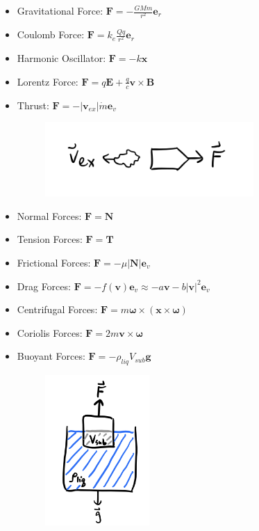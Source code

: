 \documentclass[
  letterpaper,
  DIV=11,
  numbers=noendperiod]{scrreprt}
\begin{document}
\begin{itemize}
\item
  Gravitational Force: \(\mathbf{F} = -\frac{GMm}{r^2} \mathbf{e}_r\)
\item
  Coulomb Force: \(\mathbf{F} = k_e \frac{Qq}{r^2} \mathbf{e}_r\)
\item
  Harmonic Oscillator: \(\mathbf{F} = -k\mathbf{x}\)
\item
  Lorentz Force:
  \(\mathbf{F} = q\mathbf{E} + \frac{q}{c}\mathbf{v} \times \mathbf{B}\)
\item
  Thrust: \(\mathbf{F} = - |\mathbf{v}_{ex}| \dot m \mathbf{e}_v\)

  \begin{figure}

  {\centering \includegraphics[width=3.125in,height=\textheight]{classical-mechanics/./resources/image-20230212030054782.png}

  }

  \end{figure}
\item
  Normal Forces: \(\mathbf{F} = \mathbf{N}\)
\item
  Tension Forces: \(\mathbf{F} = \mathbf{T}\)
\item
  Frictional Forces: \(\mathbf{F} = -\mu |\mathbf{N}| \mathbf{e}_v\)
\item
  Drag Forces:
  \(\mathbf{F} = -f(\mathbf{v}) \mathbf{e}_v \approx -a\mathbf{v} -b|\mathbf{v}|^2\mathbf{e}_v\)
\item
  Centrifugal Forces:
  \(\mathbf{F} = m\boldsymbol{\omega} \times (\mathbf{x} \times \boldsymbol{\omega})\)
\item
  Coriolis Forces:
  \(\mathbf{F} = 2m \mathbf{v} \times \boldsymbol{\omega}\)
\item
  Buoyant Forces: \(\mathbf{F} = - \rho_{liq} V_{sub} \mathbf{g}\)

  \begin{figure}

  {\centering \includegraphics[width=1.5625in,height=\textheight]{classical-mechanics/./resources/image-20230212031757163.png}

  }

  \end{figure}
\end{itemize}
\end{document}
